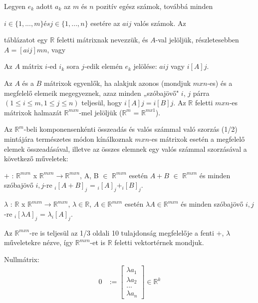 	\begin{frame}

	\begin{tcolorbox}[title={Def.: Mátrix}]	
		Legyen $e_k$ adott $a_k$ az $m$ és $n$ pozitív egész számok, továbbá minden
	
		$i \in \{1, ..., m\} és j \in \{1, ..., n\}$ esetére az $aij$ valós számok. Az
		
		táblázatot egy $\mathbb{R}$ feletti mátrixnak nevezzük, és $A$-val jelöljük, részletesebben $A = [aij]mn$, vagy
		
		Az $A$ mátrix $i$-ed $i_k$ sora $j$-edik elemén $e_k$ jelölése: $aij$ vagy $i[A]j$.
	\end{tcolorbox}
	
	\begin{tcolorbox}[title={Def.: Mátrixok egyenlősége}]	
		Az $A$ és a $B$ mátrixok egyenlők, ha alakjuk azonos (mondjuk $m x n$-es) és a megfelelő elemeik megegyeznek, azaz minden „szóbajövő" $i$, $j$ párra $(1 \leq i \leq m, 1 \leq j \leq n)$ teljesül, hogy $i[A]j = i[B]j$. Az $\mathbb{R}$ feletti $m x n$-es mátrixok halmazát $\mathbb{R}^{m x n}$-mel jelöljük ($\mathbb{R}^{m}$ = $\mathbb{R}^{m x 1}$).
	\end{tcolorbox}
	
	\begin{tcolorbox}[title={Def.: Mátrix összeadás, számmal való szorzás}]	
		Az $\mathbb{R}^{m}$-beli komponensenkénti összeadás és valós számmal való szorzás (1/2) mintájára természetes módon kínálkoznak $m x n$-es mátrixok esetén a megfelelő elemek összeadásával, illetve az összes elemnek egy valós számmal szorzásával a következő műveletek:

$+$ : $\mathbb{R}^{m x n}$ x $\mathbb{R}^{m x n} \rightarrow \mathbb{R}^{m x n}$, A, B $\in$ $\mathbb{R}^{m x n}$ esetén $A + B$ $\in$ $\mathbb{R}^{m x n}$ és minden szóbajövő
$i, j$-re $_{i} [A + B]_j$ = $_{i} [A]_j + _{i} [B]_j$.

${\lambda}$ : $\mathbb{R}$ x $\mathbb{R}^{m x n} \rightarrow \mathbb{R}^{m x n}$, ${\lambda} \in \mathbb{R}$, $A \in \mathbb{R}^{m x n}$ esetén ${\lambda}A \in \mathbb{R}^{m x n}$ és minden szóbajövő $i, j$-re $_{i} [{\lambda}A]_j$ = ${\lambda} _{i} [A]_j$.

Az $\mathbb{R}^{m x n}$-re is teljesül az 1/3 oldali 10 tulajdonság megfelelője a fenti $+$, ${\lambda}$ műveletekre nézve, így $\mathbb{R}^{m x n}$-et is $\mathbb{R}$ feletti vektortérnek mondjuk.
	\end{tcolorbox}	
	
	\begin{tcolorbox}[title={Def.: Nullmátrix}]	
		Nullmátrix:\begin{align}
				 0 &:= \begin{bmatrix}
					{\lambda}a_1 \\
					{\lambda}a_2 \\
					... \\
					{\lambda}a_n
				\end{bmatrix} \in \mathbb{R}^k
		\end{align}
	\end{tcolorbox}		
	
	\end{frame}
	
